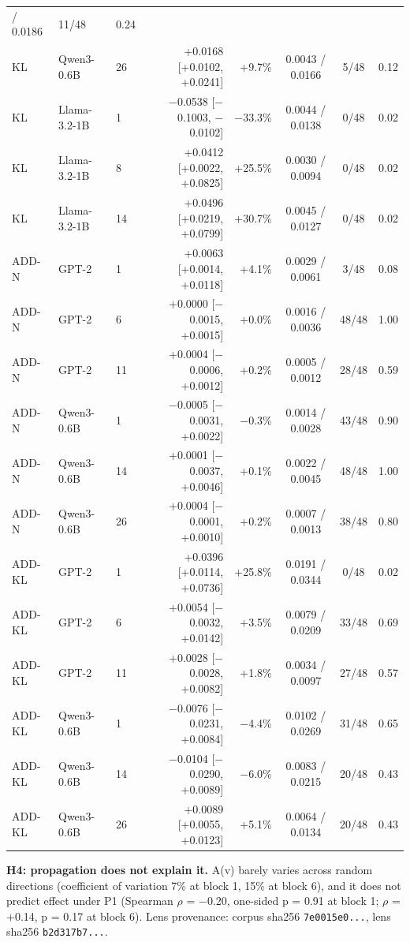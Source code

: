 \documentclass[
  10pt,
]{article}
\begin{document}
{\begin{longtable}[]{@{}lllrrccr@{}}
/ 0.0186 & 11/48 & 0.24 \\
KL & Qwen3-0.6B & 26 & +0.0168 {[}+0.0102, +0.0241{]} & +9.7\% & 0.0043
/ 0.0166 & 5/48 & 0.12 \\
KL & Llama-3.2-1B & 1 & $-$0.0538 {[}$-$0.1003, $-$0.0102{]} & $-$33.3\% &
0.0044 / 0.0138 & 0/48 & 0.02 \\
KL & Llama-3.2-1B & 8 & +0.0412 {[}+0.0022, +0.0825{]} & +25.5\% &
0.0030 / 0.0094 & 0/48 & 0.02 \\
KL & Llama-3.2-1B & 14 & +0.0496 {[}+0.0219, +0.0799{]} & +30.7\% &
0.0045 / 0.0127 & 0/48 & 0.02 \\
ADD-N & GPT-2 & 1 & +0.0063 {[}+0.0014, +0.0118{]} & +4.1\% & 0.0029 /
0.0061 & 3/48 & 0.08 \\
ADD-N & GPT-2 & 6 & +0.0000 {[}$-$0.0015, +0.0015{]} & +0.0\% & 0.0016 /
0.0036 & 48/48 & 1.00 \\
ADD-N & GPT-2 & 11 & +0.0004 {[}$-$0.0006, +0.0012{]} & +0.2\% & 0.0005 /
0.0012 & 28/48 & 0.59 \\
ADD-N & Qwen3-0.6B & 1 & $-$0.0005 {[}$-$0.0031, +0.0022{]} & $-$0.3\% &
0.0014 / 0.0028 & 43/48 & 0.90 \\
ADD-N & Qwen3-0.6B & 14 & +0.0001 {[}$-$0.0037, +0.0046{]} & +0.1\% &
0.0022 / 0.0045 & 48/48 & 1.00 \\
ADD-N & Qwen3-0.6B & 26 & +0.0004 {[}$-$0.0001, +0.0010{]} & +0.2\% &
0.0007 / 0.0013 & 38/48 & 0.80 \\
ADD-KL & GPT-2 & 1 & +0.0396 {[}+0.0114, +0.0736{]} & +25.8\% & 0.0191 /
0.0344 & 0/48 & 0.02 \\
ADD-KL & GPT-2 & 6 & +0.0054 {[}$-$0.0032, +0.0142{]} & +3.5\% & 0.0079 /
0.0209 & 33/48 & 0.69 \\
ADD-KL & GPT-2 & 11 & +0.0028 {[}$-$0.0028, +0.0082{]} & +1.8\% & 0.0034 /
0.0097 & 27/48 & 0.57 \\
ADD-KL & Qwen3-0.6B & 1 & $-$0.0076 {[}$-$0.0231, +0.0084{]} & $-$4.4\% &
0.0102 / 0.0269 & 31/48 & 0.65 \\
ADD-KL & Qwen3-0.6B & 14 & $-$0.0104 {[}$-$0.0290, +0.0089{]} & $-$6.0\% &
0.0083 / 0.0215 & 20/48 & 0.43 \\
ADD-KL & Qwen3-0.6B & 26 & +0.0089 {[}+0.0055, +0.0123{]} & +5.1\% &
0.0064 / 0.0134 & 20/48 & 0.43 \\
\end{longtable}
}

\textbf{H4: propagation does not explain it.} A(v) barely varies across
random directions (coefficient of variation 7\% at block 1, 15\% at
block 6), and it does not predict \textbar effect\textbar{} under P1
(Spearman $\rho$ = $-$0.20, one-sided p = 0.91 at block 1; $\rho$ = +0.14, p = 0.17
at block 6). Lens provenance: corpus sha256 \texttt{7e0015e0...}, lens
sha256 \texttt{b2d317b7...}.
\end{document}
